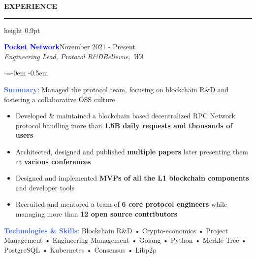 \documentclass[
    11pt, %
]{resume} %
\newenvironment{rSectionCustom}[1]{
  \Large
  \sectionskip
  \textbf{\textcolor{Cerulean}{\MakeUppercase{#1}}}
  \vspace{0.5em}
  {\color{Blue}\hrule height 0.9pt}
  \vspace{0.25em}

  \begin{list}{}{
    \setlength{\leftmargin}{1.5em}
  }
  \item[]
}{
    \vspace{1em}
    \end{list}
}
\newenvironment{rSubsection2}[4]{
  \normalsize
  \hspace{-18pt}\textcolor{Blue}{\textbf{\large #1}}\hfill{#2}
  \\
  \hspace*{-18pt}\emph{#3}\hfill\emph{#4}
  \begin{list}{$\cdot$}{\leftmargin=-0em}
  \itemsep -0.5em \vspace{-0.25em}
}{
    \vspace{1em}
    \end{list}
}
\begin{document}

\begin{rSectionCustom}{Experience}

    \begin{rSubsection2}{Pocket Network}{November 2021 - Present}{Engineering Lead, Protocol R\&D}{Bellevue, WA}

        \item[] \textcolor{RoyalBlue}{\textbf{Summary}}: Managed the protocol team, focusing on blockchain R\&D and fostering a collaborative OSS culture
        \begin{itemize}[leftmargin=*]
            \item Developed \& maintained a blockchain based decentralized RPC Network protocol handling more than \textbf{1.5B daily requests and thousands of users}
            \item Architected, designed and published \textbf{multiple papers} later presenting them at \textbf{various conferences}
            \item Designed and implemented \textbf{MVPs of all the L1 blockchain components} and developer tools
            \item Recruited and mentored a team of \textbf{6 core protocol engineers} while managing more than \textbf{12 open source contributors}
        \end{itemize}
        \vspace{0.5em}
        \item[] \textcolor{RoyalBlue}{\textbf{Technologies \& Skills}}: Blockchain R\&D • Crypto-economics • Project Management • Engineering Management • Golang • Python • Merkle Tree • PostgreSQL • Kubernetes • Consensus • Libp2p
    \end{rSubsection2}


\end{rSectionCustom}
\end{document}
